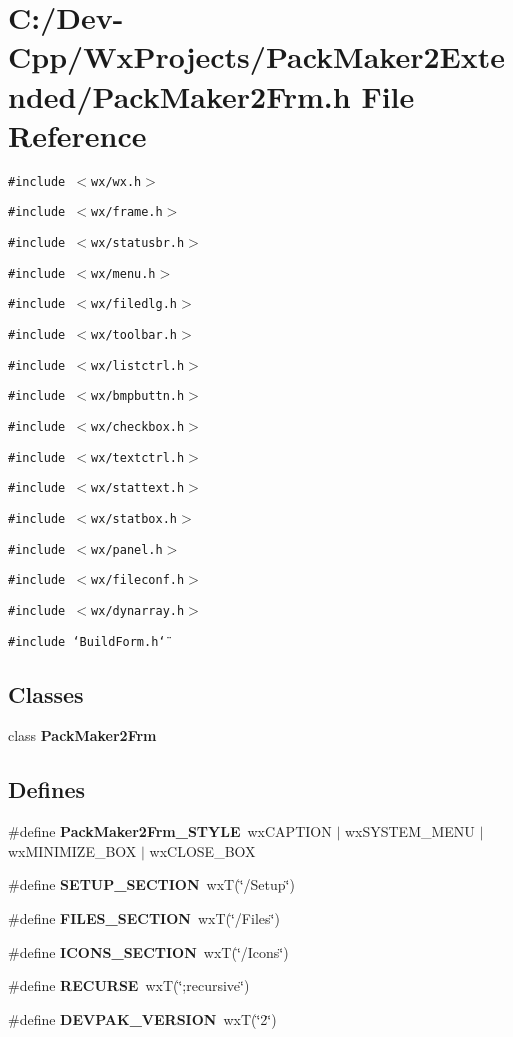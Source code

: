 \section{C:/Dev-Cpp/Wx\-Projects/Pack\-Maker2Extended/Pack\-Maker2Frm.h File Reference}
\label{_pack_maker2_frm_8h}
{\tt \#include $<$wx/wx.h$>$}\par
{\tt \#include $<$wx/frame.h$>$}\par
{\tt \#include $<$wx/statusbr.h$>$}\par
{\tt \#include $<$wx/menu.h$>$}\par
{\tt \#include $<$wx/filedlg.h$>$}\par
{\tt \#include $<$wx/toolbar.h$>$}\par
{\tt \#include $<$wx/listctrl.h$>$}\par
{\tt \#include $<$wx/bmpbuttn.h$>$}\par
{\tt \#include $<$wx/checkbox.h$>$}\par
{\tt \#include $<$wx/textctrl.h$>$}\par
{\tt \#include $<$wx/stattext.h$>$}\par
{\tt \#include $<$wx/statbox.h$>$}\par
{\tt \#include $<$wx/panel.h$>$}\par
{\tt \#include $<$wx/fileconf.h$>$}\par
{\tt \#include $<$wx/dynarray.h$>$}\par
{\tt \#include \char`\"{}Build\-Form.h\char`\"{}}\par
\subsection*{Classes}
\begin{CompactItemize}
\item 
class {\bf Pack\-Maker2Frm}
\end{CompactItemize}
\subsection*{Defines}
\begin{CompactItemize}
\item 
\#define {\bf Pack\-Maker2Frm\_\-STYLE}~wx\-CAPTION $|$ wx\-SYSTEM\_\-MENU $|$ wx\-MINIMIZE\_\-BOX $|$ wx\-CLOSE\_\-BOX
\item 
\#define {\bf SETUP\_\-SECTION}~wx\-T(\char`\"{}/Setup\char`\"{})
\item 
\#define {\bf FILES\_\-SECTION}~wx\-T(\char`\"{}/Files\char`\"{})
\item 
\#define {\bf ICONS\_\-SECTION}~wx\-T(\char`\"{}/Icons\char`\"{})
\item 
\#define {\bf RECURSE}~wx\-T(\char`\"{};recursive\char`\"{})
\item 
\#define {\bf DEVPAK\_\-VERSION}~wx\-T(\char`\"{}2\char`\"{})
\end{CompactItemize}


